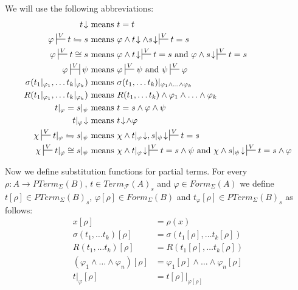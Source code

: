 \documentclass[reqno]{amsart}
\theoremstyle{definition}
\theoremstyle{remark}
\numberwithin{figure}{section}
\begin{document}
We will use the following abbreviations:
\begin{align*}
t\!\downarrow & \text{ means } t = t \\
\varphi \sststile{}{V} t \leftrightharpoons s & \text{ means } \varphi \land t\!\downarrow \land s\!\downarrow\,\sststile{}{V} t = s \\
\varphi \sststile{}{V} t \cong s & \text{ means } \varphi \land t\!\downarrow\,\sststile{}{V} t = s \text{ and } \varphi \land s\!\downarrow\,\sststile{}{V} t = s \\
\varphi \ssststile{}{V} \psi & \text{ means } \varphi \sststile{}{V} \psi \text{ and } \psi \sststile{}{V} \varphi \\
\sigma(t_1|_{\varphi_1}, \ldots t_k|_{\varphi_k}) & \text{ means } \sigma(t_1, \ldots t_k)|_{\varphi_1 \land \ldots \land \varphi_k} \\
R(t_1|_{\varphi_1}, \ldots t_k|_{\varphi_k}) & \text{ means } R(t_1, \ldots t_k) \land \varphi_1 \land \ldots \land \varphi_k \\
t|_\varphi = s|_\psi & \text{ means } t = s \land \varphi \land \psi \\
t|_\varphi\!\downarrow & \text{ means } t\!\downarrow\!\land \varphi \\
\chi \sststile{}{V} t|_\varphi \leftrightharpoons s|_\psi & \text{ means } \chi \land t|_\varphi\!\downarrow, s|_\psi\!\downarrow\,\sststile{}{V} t = s \\
\chi \sststile{}{V} t|_\varphi \cong s|_\psi & \text{ means } \chi \land t|_\varphi\!\downarrow\,\sststile{}{V} t = s \land \psi \text{ and } \chi \land s|_\psi\!\downarrow\,\sststile{}{V} t = s \land \varphi
\end{align*}

Now we define substitution functions for partial terms.
For every $\rho : A \to PTerm_\Sigma(B)$, $t \in Term_\mathcal{F}(A)_s$ and $\varphi \in Form_\Sigma(A)$
we define $t[\rho] \in PTerm_\Sigma(B)_s$, $\varphi[\rho] \in Form_\Sigma(B)$ and $t_\varphi[\rho] \in PTerm_\Sigma(B)_s$ as follows:
\begin{align*}
x[\rho] & = \rho(x) \\
\sigma(t_1, \ldots t_k)[\rho] & = \sigma(t_1[\rho], \ldots t_k[\rho]) \\
R(t_1, \ldots t_k)[\rho] & = R(t_1[\rho], \ldots t_k[\rho]) \\
(\varphi_1 \land \ldots \land \varphi_n)[\rho] & = \varphi_1[\rho] \land \ldots \land \varphi_n[\rho] \\
t|_\varphi[\rho] & = t[\rho]|_{\varphi[\rho]}
\end{align*}
\end{document}

